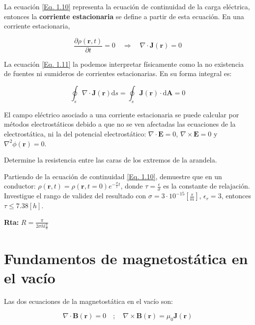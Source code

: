 \documentclass[11pt,fleqn]{book}
\renewcommand{\vec}[1]{\mathbf{#1}}
\begin{document}
La ecuación \ref{Eq. 1.10} representa la ecuación de continuidad de la carga eléctrica, entonces la \textbf{corriente estacionaria} se define a partir de esta ecuación. En una corriente estacionaria,

\begin{equation}
    \frac{\partial\rho(\vec{r},t)}{\partial t}=0\quad\Longrightarrow\quad \nabla\cdot\vec{J}(\vec{r})=0
    \label{Eq. 1.11}
\end{equation}

La ecuación \ref{Eq. 1.11} la podemos interpretar físicamente como la no existencia de fuentes ni sumideros de corrientes estacionarias. En su forma integral es:

\begin{equation*}
    \oint_{s}\nabla\cdot\vec{J}(\vec{r})\mathrm{d}s=\oint_{s}\vec{J}(\vec{r})\cdot\mathrm{d}\vec{A}=0
\end{equation*}

El campo eléctrico asociado a una corriente estacionaria se puede calcular por métodos electrostáticos debido a que no se ven afectadas las ecuaciones de la electrostática, ni la del potencial electrostático: $\nabla\cdot\vec{E}=0$, $\nabla\times\vec{E}=0$ y $\nabla^{2}\phi(\vec{r})=0$.

\begin{exercise}
Determine la resistencia entre las caras de los extremos de la arandela.

Partiendo de la ecuación de continuidad \ref{Eq. 1.10}, demuestre que en un conductor: $\rho(\vec{r},t)=\rho(\vec{r},t=0)e^{-\frac{\sigma}{\epsilon}t}$, donde $\tau=\frac{\epsilon}{\sigma}$ es la constante de relajación. Investigue el rango de validez del resultado con $\sigma=3\cdot 10^{-15}\left[\frac{s}{m}\right]$, $\epsilon_{r}=3$, entonces $\tau\leq 7.38[h]$.

\textbf{Rta:} $R=\frac{\pi}{2\sigma hl\frac{b}{a}}$
\end{exercise}


\section{Fundamentos de magnetostática en el vacío}

Las dos ecuaciones de la magnetostática en el vacío son:

\begin{equation}
    \nabla\cdot\vec{B}(\vec{r})=0\quad;\quad\nabla\times\vec{B}(\vec{r})=\mu_{0}\vec{J}(\vec{r})
    \label{Eq. 1.12}
\end{equation}
\end{document}

